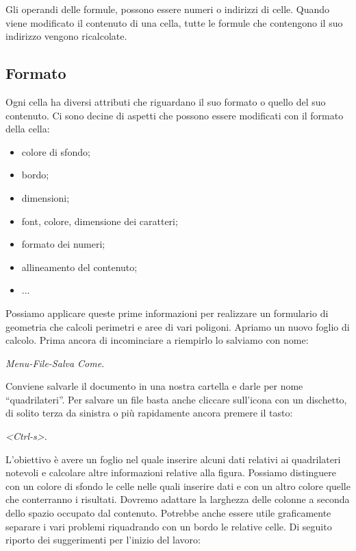 Gli operandi delle formule, possono essere numeri o indirizzi di celle.
Quando viene modificato il contenuto di una cella, tutte
le formule che contengono il suo indirizzo vengono ricalcolate.

\subsection{Formato}
\label{05_01_f_di_calc:formato}

Ogni cella ha diversi attributi che riguardano il suo formato o quello del
suo contenuto.
Ci sono decine di aspetti che possono essere modificati con
il formato della cella:

\begin{itemize} [noitemsep]
\item colore di sfondo;
\item bordo;
\item dimensioni;
\item font, colore, dimensione dei caratteri;
\item formato dei numeri;
\item allineamento del contenuto;
\item ...
\end{itemize}

Possiamo applicare queste prime informazioni per realizzare un formulario di
geometria che calcoli perimetri e aree di vari poligoni.
Apriamo un nuovo foglio di calcolo. Prima ancora di incominciare a riempirlo
lo salviamo con nome:

\emph{Menu-File-Salva Come}.

Conviene salvarle il documento
in una nostra cartella e darle per nome ``quadrilateri''.
Per salvare un file basta anche cliccare sull'icona con un dischetto,
di solito terza da sinistra o più rapidamente ancora premere il tasto:

\emph{\textless{}Ctrl-s\textgreater{}}.

L'obiettivo è avere un foglio nel quale inserire alcuni dati relativi ai
quadrilateri notevoli e calcolare altre informazioni relative alla figura.
Possiamo distinguere con un colore di sfondo le celle nelle quali inserire
dati e con un altro colore quelle che conterranno i risultati.
Dovremo adattare la larghezza delle colonne a seconda dello spazio occupato
dal contenuto.
Potrebbe anche essere utile graficamente separare i vari problemi
riquadrando con un bordo le relative celle.
Di seguito riporto dei suggerimenti per l'inizio del lavoro:

